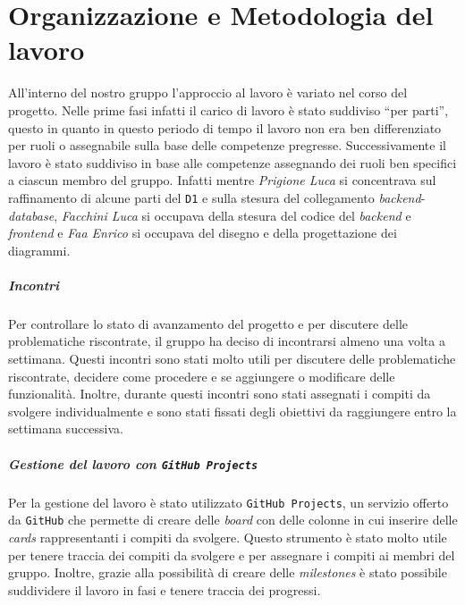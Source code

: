 \chapter{Organizzazione e Metodologia del lavoro}
All'interno del nostro gruppo l'approccio al lavoro è variato nel corso del progetto. Nelle prime fasi infatti il carico di lavoro è stato suddiviso ``per parti'', questo in quanto in questo periodo di tempo il lavoro non era ben differenziato per ruoli o assegnabile sulla base delle competenze pregresse. Successivamente il lavoro è stato suddiviso in base alle competenze assegnando dei ruoli ben specifici a ciascun membro del gruppo. Infatti mentre \textit{Prigione Luca} si concentrava sul raffinamento di alcune parti del \texttt{D1} e sulla stesura del collegamento \textit{backend}-\textit{database}, \textit{Facchini Luca} si occupava della stesura del codice del \textit{backend} e \textit{frontend} e \textit{Faa Enrico} si occupava del disegno e della progettazione dei diagrammi.
\paragraph{Incontri}
    Per controllare lo stato di avanzamento del progetto e per discutere delle problematiche riscontrate, il gruppo ha deciso di incontrarsi almeno una volta a settimana. Questi incontri sono stati molto utili per discutere delle problematiche riscontrate, decidere come procedere e se aggiungere o modificare delle funzionalità. Inoltre, durante questi incontri sono stati assegnati i compiti da svolgere individualmente e sono stati fissati degli obiettivi da raggiungere entro la settimana successiva.
\paragraph{Gestione del lavoro con \texttt{GitHub Projects}}
    Per la gestione del lavoro è stato utilizzato \texttt{GitHub Projects}, un servizio offerto da \texttt{GitHub} che permette di creare delle \textit{board} con delle colonne in cui inserire delle \textit{cards} rappresentanti i compiti da svolgere. Questo strumento è stato molto utile per tenere traccia dei compiti da svolgere e per assegnare i compiti ai membri del gruppo. Inoltre, grazie alla possibilità di creare delle \textit{milestones} è stato possibile suddividere il lavoro in fasi e tenere traccia dei progressi.